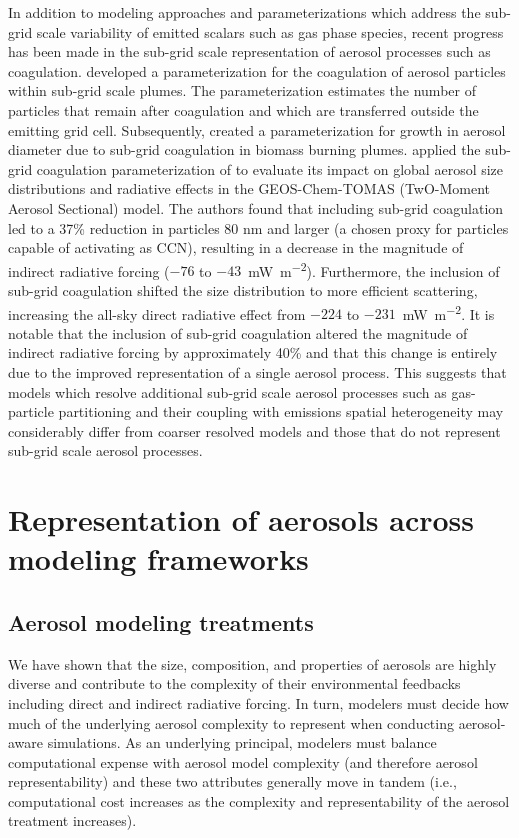 In addition to modeling approaches and parameterizations which address the sub-grid scale variability of emitted scalars such as gas phase species, recent progress has been made in the sub-grid scale representation of aerosol processes such as coagulation. \textcite{pierce_parameterization_2009} developed a parameterization for the coagulation of aerosol particles within sub-grid scale plumes. The parameterization estimates the number of particles that remain after coagulation and which are transferred outside the emitting grid cell. Subsequently, \textcite{sakamoto_evolution_2016} created a parameterization for growth in aerosol diameter due to sub-grid coagulation in biomass burning plumes. \textcite{ramnarine_effects_2019} applied the sub-grid coagulation parameterization of \textcite{sakamoto_evolution_2016} to evaluate its impact on global aerosol size distributions and radiative effects in the GEOS-Chem-TOMAS (TwO-Moment Aerosol Sectional) model. The authors found that including sub-grid coagulation led to a 37\% reduction in particles 80 nm and larger (a chosen proxy for particles capable of activating as CCN), resulting in a decrease in the magnitude of indirect radiative forcing ($-76$ to $-43$~\si{mW.m^{-2}}). Furthermore, the inclusion of sub-grid coagulation shifted the size distribution to more efficient scattering, increasing the all-sky direct radiative effect from $-224$ to $-231$~\si{mW.m^{-2}}. It is notable that the inclusion of sub-grid coagulation altered the magnitude of indirect radiative forcing by approximately 40\% and that this change is entirely due to the improved representation of a single aerosol process. This suggests that models which resolve additional sub-grid scale aerosol processes such as gas-particle partitioning and their coupling with emissions spatial heterogeneity may considerably differ from coarser resolved models and those that do not represent sub-grid scale aerosol processes. 


\section{Representation of aerosols across modeling frameworks}\label{aerosol_model_treatments} 

\subsection{Aerosol modeling treatments}

We have shown that the size, composition, and properties of aerosols are highly diverse and contribute to the complexity of their environmental feedbacks including direct and indirect radiative forcing. In turn, modelers must decide how much of the underlying aerosol complexity to represent when conducting aerosol-aware simulations. As an underlying principal, modelers must balance computational expense with aerosol model complexity (and therefore aerosol representability) and these two attributes generally move in tandem (i.e., computational cost increases as the complexity and representability of the aerosol treatment increases). 

